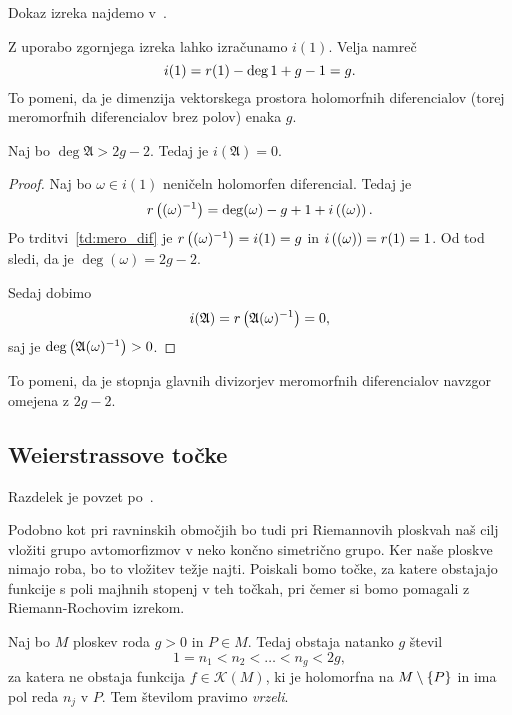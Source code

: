 Dokaz izreka najdemo v~\cite[izrek III.4.11]{Farkas_Kra_1980}.

\begin{zgled}
Z uporabo zgornjega izreka lahko izračunamo $i(1)$. Velja namreč
\[
i(1) = r(1) - \deg 1 + g - 1 = g. \qedhere
\]
To pomeni, da je dimenzija vektorskega prostora holomorfnih
diferencialov (torej meromorfnih diferencialov brez polov) enaka
$g$.
\end{zgled}

\begin{trditev}
Naj bo $\deg \mathfrak{A} > 2g - 2$. Tedaj je
$i(\mathfrak{A}) = 0$.
\end{trditev}

\begin{proof}
Naj bo $\omega \in i(1)$ neničeln holomorfen diferencial. Tedaj je
\[
r \left((\omega)^{-1}\right) = \deg (\omega) - g + 1 + i \left((\omega)\right).
\]
Po trditvi~\ref{td:mero_dif} je $r \left((\omega)^{-1}\right) = i(1) = g$
in $i \left((\omega)\right) = r(1) = 1$. Od tod sledi, da je
$\deg (\omega) = 2g - 2$.

Sedaj dobimo
\[
i(\mathfrak{A}) = r \left(\mathfrak{A} (\omega)^{-1}\right) = 0,
\]
saj je $\deg \left(\mathfrak{A} (\omega)^{-1}\right) > 0$.
\end{proof}

To pomeni, da je stopnja glavnih divizorjev meromorfnih
diferencialov navzgor omejena z $2g - 2$.

\subsection{Weierstrassove točke}

Razdelek je povzet po~\cite[poglavje III.5]{Farkas_Kra_1980}.

Podobno kot pri ravninskih območjih bo tudi pri Riemannovih
ploskvah naš cilj vložiti grupo avtomorfizmov v neko končno
simetrično grupo. Ker naše ploskve nimajo roba, bo to vložitev
težje najti. Poiskali bomo točke, za katere obstajajo funkcije s
poli majhnih stopenj v teh točkah, pri čemer si bomo pomagali z
Riemann-Rochovim izrekom.

\begin{izrek}[Weierstrass]
Naj bo $M$ ploskev roda $g > 0$ in $P \in M$. Tedaj obstaja
natanko $g$ števil
\[
1 = n_1 < n_2 < \dots < n_g < 2g,
\]
za katera ne obstaja funkcija $f \in \mathscr{K}(M)$, ki je
holomorfna na $M \setminus \left\{P\right\}$ in ima pol reda $n_j$ v $P$.
Tem številom pravimo \emph{vrzeli}.
\end{izrek}

